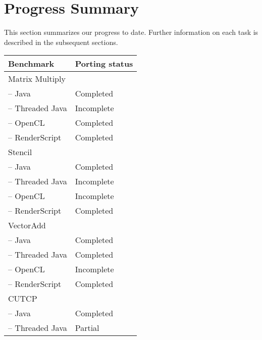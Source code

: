 
\section*{Progress Summary}

This section summarizes our progress to date. Further information on each task
is described in the subsequent sections.


\begin{table}[h]\small
\centering
\begin{tabular}{ | l | p{2cm} |}
    \hline 
    Benchmark & Porting status \\ \hline
    Matrix Multiply & \\
    \hspace{0.5cm}-- Java & Completed \\
    \hspace{0.5cm}-- Threaded Java & Incomplete \\
    \hspace{0.5cm}-- OpenCL & Completed \\
    \hspace{0.5cm}-- RenderScript & Completed \\ \hline
    Stencil & \\
    \hspace{0.5cm}-- Java & Completed \\
    \hspace{0.5cm}-- Threaded Java & Incomplete \\
    \hspace{0.5cm}-- OpenCL & Incomplete \\
    \hspace{0.5cm}-- RenderScript & Completed \\ \hline
    VectorAdd & \\
    \hspace{0.5cm}-- Java & Completed \\
    \hspace{0.5cm}-- Threaded Java & Completed \\
    \hspace{0.5cm}-- OpenCL & Incomplete \\
    \hspace{0.5cm}-- RenderScript & Completed \\ \hline
    CUTCP & \\
    \hspace{0.5cm}-- Java & Completed \\
    \hspace{0.5cm}-- Threaded Java & Partial \\

\end{tabular}
\end{table}

